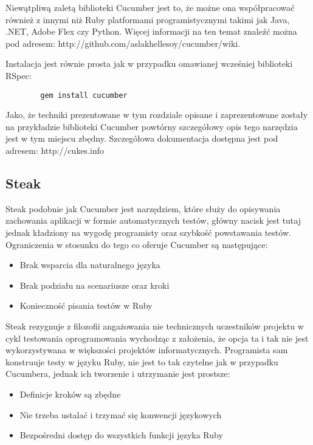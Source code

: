       Niewątpliwą zaletą biblioteki Cucumber jest to, że możne ona współpracować również z innymi niż Ruby platformami programistycznymi takimi jak Java, .NET, Adobe Flex czy Python. Więcej informacji na ten temat znaleźć można pod adresem: http://github.com/aslakhellesoy/cucumber/wiki.
      
      Instalacja jest równie prosta jak w przypadku omawianej wcześniej biblioteki RSpec:
      
      \begin{lstlisting}
        gem install cucumber
      \end{lstlisting}
      
      Jako, że techniki prezentowane w tym rozdziale opisane i zaprezentowane zostały na przykładzie biblioteki Cucumber powtórny szczegółowy opis tego narzędzia jest w tym miejscu zbędny. Szczegółowa dokumentacja dostępna jest pod adresem: http://cukes.info
      
    \subsection{Steak}
      Steak podobnie jak Cucumber jest narzędziem, które służy do opisywania zachowania aplikacji w formie automatycznych testów, główny nacisk jest tutaj jednak kładziony na wygodę programisty oraz szybkość powstawania testów. Ograniczenia w stosunku do tego co oferuje Cucumber są następujące:
      
      \begin{itemize}
        \item Brak wsparcia dla naturalnego języka
        \item Brak podziału na scenariusze oraz kroki
        \item Konieczność pisania testów w Ruby
      \end{itemize}
      
      Steak rezygnuje z filozofii angażowania nie technicznych uczestników projektu w cykl testowania oprogramowania wychodząc z założenia, że opcja ta i tak nie jest wykorzystywana w większości projektów informatycznych. Programista sam konstruuje testy w języku Ruby, nie jest to tak czytelne jak w przypadku Cucumbera, jednak ich tworzenie i utrzymanie jest prostsze:
      
      \begin{itemize}
        \item Definicje kroków są zbędne
        \item Nie trzeba ustalać i trzymać się konwencji językowych
        \item Bezpośredni dostęp do wszystkich funkcji języka Ruby
      \end{itemize}
      
